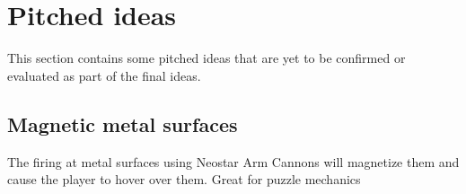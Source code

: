 \documentclass[../Main.tex]{subfiles}
\begin{document}
\section{Pitched ideas}

This section contains some pitched ideas that are yet to be confirmed or evaluated as part of the final ideas.

\subsection{Magnetic metal surfaces}

The firing at metal surfaces using Neostar Arm Cannons will magnetize them and cause the player to hover over them. Great for puzzle mechanics
\end{document}
